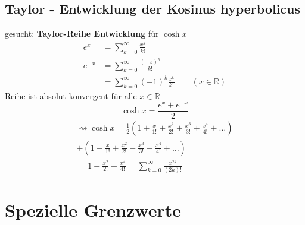 \subsection{Taylor - Entwicklung der Kosinus hyperbolicus}
gesucht: \textbf{Taylor-Reihe Entwicklung} für $\cosh x$\\
\begin{align*}
e^x &= \sum_{ k = 0 }^{ \infty }{ \frac{x^k}{k!} }\\
e^{-x} &= \sum_{ k = 0 }^{\infty}{\frac{(-x)^k}{k!}}\\
&= \sum_{ k = 0 }^{\infty}{(-1)^k\frac{x^k}{k!}}
\qquad (x \in \mathbb{R})
\end{align*}
Reihe ist absolut konvergent für alle $ x \in \mathbb{R}$ \\
\[\cosh x= \frac{e^x + e^{-x}}{2}\]
\begin{gather*}
\rightsquigarrow \cosh x= \frac{1}{2}(1+\frac{x}{1!}+ \frac{x^2}{2!} + \frac{x^3}{3!}+\frac{x^4}{4!} + \dots )\\
+(1-\frac{x}{1!}+ \frac{x^2}{2!} - \frac{x^3}{3!}+\frac{x^4}{4!} + \dots)\\
=1 + \frac{x^2}{2!}+  \frac{x^4}{4!} = \sum_{k=0}^{\infty}{\frac{x^{2k}}{(2k)!}}
\end{gather*}
\section{Spezielle Grenzwerte}
